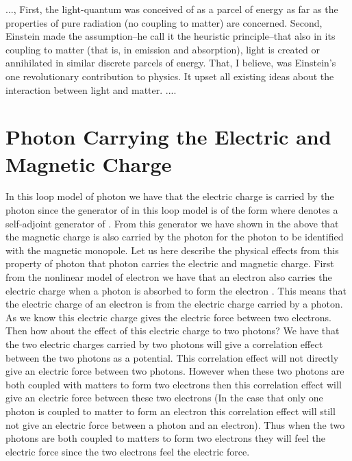 \documentclass[a4paper,a4paper]{article}
\begin{document}
..., First, the light-quantum was conceived of as a parcel of energy as far as the properties of pure radiation (no coupling to matter) are concerned. Second, Einstein made the assumption--he call it the heuristic principle--that also in its coupling to matter (that is, in emission and absorption), light is created or annihilated in similar discrete parcels of energy. That, I believe, was Einstein's one revolutionary contribution to physics. It upset all existing ideas about the interaction between light and matter. ....

\section{Photon Carrying the Electric and Magnetic Charge}

In this loop model of photon we have that the electric charge \coordHE{} is carried by the photon since the generator \coordHE{} of \coordHE{} in this loop model is of the form \coordHE{} where \coordHE{} denotes a self-adjoint generator of \coordHE{}. From this generator \coordHE{} we have shown in the above that the magnetic charge \coordHE{} is also carried by the photon for the photon to be identified with the magnetic monopole. Let us here describe the physical effects from this property of photon that photon carries the electric and magnetic charge. First from the nonlinear model of electron we have that an electron \coordHE{} also carries the electric charge when a photon \coordHE{} is absorbed to form the electron \coordHE{}. This means that the electric charge of an electron is from the electric charge carried by a photon. As we know this electric charge gives the electric force between two electrons. Then how about the effect of this electric charge to two photons? We have that the two electric charges carried by two photons will give a correlation effect between the two photons as a potential. This correlation effect will not directly give an electric force between two photons. However when these two photons are both coupled with matters to form two electrons then this  correlation effect will give an electric force between these two electrons (In the case that only one photon is coupled to matter to form an electron this correlation effect will still not give an electric force between a photon and an electron). Thus when the two photons are both coupled to matters to form two electrons they will feel the electric force since the two electrons feel the electric force.
\end{document}
